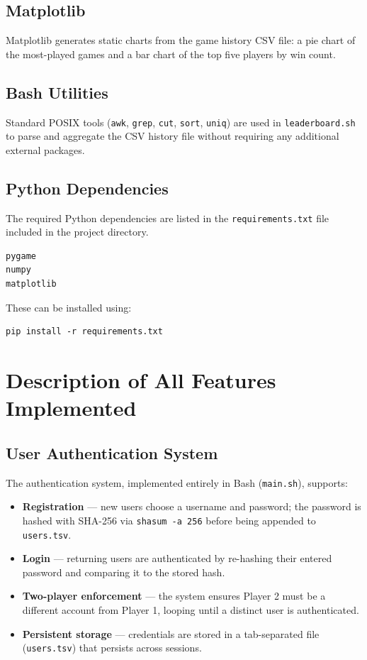 \documentclass[12pt,a4paper]{article}
\begin{document}
\subsection{Matplotlib}
Matplotlib generates static charts from the game history CSV file: a pie chart of the
most-played games and a bar chart of the top five players by win count.

\subsection{Bash Utilities}
Standard POSIX tools (\texttt{awk}, \texttt{grep}, \texttt{cut}, \texttt{sort}, \texttt{uniq})
are used in \texttt{leaderboard.sh} to parse and aggregate the CSV history file without
requiring any additional external packages.

\subsection{Python Dependencies}

The required Python dependencies are listed in the \texttt{requirements.txt} file included in the project directory.

\begin{verbatim}
pygame
numpy
matplotlib
\end{verbatim}

These can be installed using:

\begin{verbatim}
pip install -r requirements.txt
\end{verbatim}
\newpage
\section{Description of All Features Implemented}

\subsection{User Authentication System}
The authentication system, implemented entirely in Bash (\texttt{main.sh}), supports:
\begin{itemize}[leftmargin=*]
    \item \textbf{Registration} --- new users choose a username and password; the password is
          hashed with SHA-256 via \texttt{shasum -a 256} before being appended to \texttt{users.tsv}.
    \item \textbf{Login} --- returning users are authenticated by re-hashing their entered
          password and comparing it to the stored hash.
    \item \textbf{Two-player enforcement} --- the system ensures Player 2 must be a different
          account from Player 1, looping until a distinct user is authenticated.
    \item \textbf{Persistent storage} --- credentials are stored in a tab-separated file
          (\texttt{users.tsv}) that persists across sessions.
\end{itemize}
\end{document}
